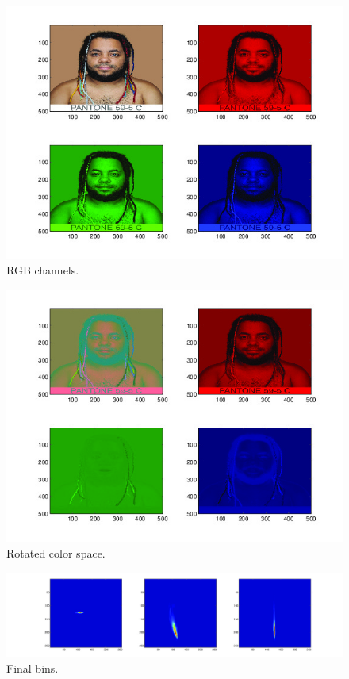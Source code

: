 \begin{figure}[h!]
  \centering
    \includegraphics[width=\textwidth]{Chapter4/Figs/rainbowmanRGB.jpg}
    \caption{RGB channels.}
\end{figure}

\begin{figure}[h!]
  \centering
    \includegraphics[width=\textwidth]{Chapter4/Figs/rainbowmanRotated.jpg}
    \caption{Rotated color space.}
\end{figure}

\begin{figure}[h!]
  \centering
    \includegraphics[width=\textwidth]{Chapter4/Figs/binsFinal2.jpg}
    \caption{Final bins.}
\end{figure}

